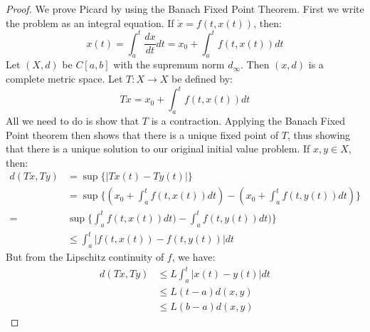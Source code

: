 \documentclass[crop=false,class=article,oneside]{standalone}
\begin{document}
            \begin{proof}
                We prove Picard by using the
                Banach Fixed Point Theorem. First
                we write the problem as an integral
                equation.
                If $\dot{x}=f(t,x(t))$, then:
                \begin{equation*}
                    x(t)
                    =\int_{a}^{t}\frac{dx}{dt}dt
                    =x_{0}+\int_{a}^{t}f(t,x(t))dt
                \end{equation*}
                Let $(X,d)$ be $C[a,b]$ with the
                supremum norm $d_{\infty}$. Then
                $(x,d)$ is a complete metric space.
                Let $T:{X}\rightarrow{X}$ be defined
                by:
                \begin{equation*}
                    Tx=x_{0}+\int_{a}^{t}f(t,x(t))dt
                \end{equation*}
                All we need to do is show that $T$ is
                a contraction. Applying the
                Banach Fixed Point theorem then
                shows that there is a unique
                fixed point of $T$, thus showing
                that there is a unique solution
                to our original initial value problem.
                If $x,y\in{X}$, then:
                \begin{align*}
                    d(Tx,Ty)
                    &=\sup\{|Tx(t)-Ty(t)|\}\\
                    &=\sup\{
                        (x_{0}+
                         \int_{a}^{t}f(t,x(t))dt)
                       -(x_{0}+
                         \int_{a}^{t}f(t,y(t))dt)
                    \}\\
                    =&\sup\{
                        \int_{a}^{t}f(t,x(t))dt)-
                        \int_{a}^{t}f(t,y(t))dt)
                    \}\\
                    &\leq\int_{a}^{t}|
                        f(t,x(t))-f(t,y(t))|dt
                \end{align*}
                But from the Lipschitz continuity
                of $f$, we have:
                \begin{align*}
                    d(Tx,Ty)&\leq
                    L\int_{a}^{t}|x(t)-y(t)|dt\\
                    &\leq{L}(t-a)d(x,y)\\
                    &\leq{L}(b-a)d(x,y)
                \end{align*}

\end{proof}
\end{document}
